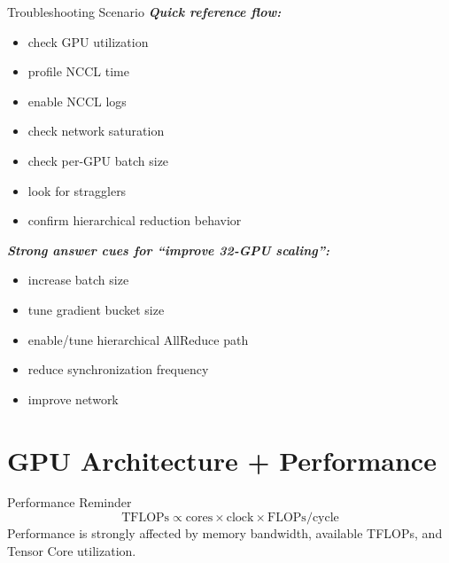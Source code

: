 \documentclass[12pt]{article}
\let\origtextbf\textbf
\renewcommand{\textbf}[1]{\origtextbf{\textit{#1}}}
\begin{document}
\begin{redbox}{Troubleshooting Scenario}
\textbf{Quick reference flow:}
\begin{itemize}
\item check GPU utilization
\item profile NCCL time
\item enable NCCL logs
\item check network saturation
\item check per-GPU batch size
\item look for stragglers
\item confirm hierarchical reduction behavior
\end{itemize}

\textbf{Strong answer cues for ``improve 32-GPU scaling'':}
\begin{itemize}
\item increase batch size
\item tune gradient bucket size
\item enable/tune hierarchical AllReduce path
\item reduce synchronization frequency
\item improve network
\end{itemize}
\end{redbox}

\vspace{2cm}

\section{GPU Architecture + Performance}

\begin{bluebox}{Performance Reminder}
\[
\text{TFLOPs} \propto \text{cores} \times \text{clock} \times \text{FLOPs/cycle}
\]
Performance is strongly affected by memory bandwidth, available TFLOPs, and Tensor Core utilization.
\end{bluebox}
\end{document}

